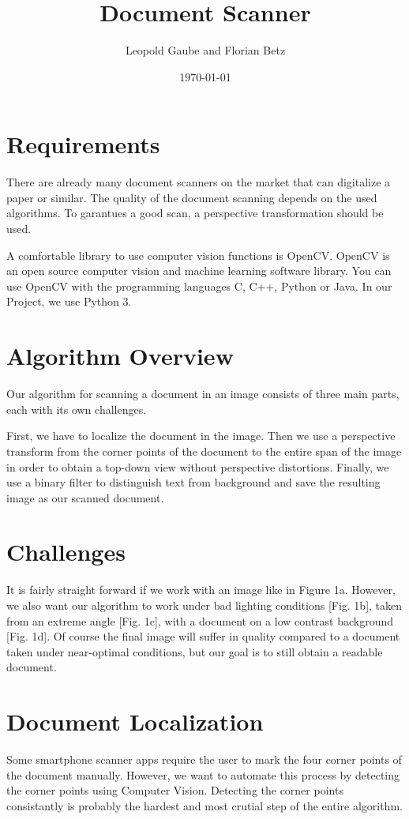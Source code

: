 \documentclass[bibliography=totoc]{scrartcl}
\title{Document Scanner}
\author{Leopold Gaube and Florian Betz}
\date{\today}
\begin{document}
	\maketitle
	\tableofcontents

	\clearpage

	\section{Requirements}
	There are already many document scanners on the market that can digitalize a paper or similar. 
	The quality of the document scanning depends on the used algorithms.
	To garantues a good scan, a perspective transformation should be used.
	
	A comfortable library to use computer vision functions is \ac{OpenCV}.
	\ac{OpenCV} is an open source computer vision and machine learning software library. \cite{OpenCV}
	You can use OpenCV with the programming languages C, C++, Python or Java.
	In our Project, we use Python 3.
	

    \section{Algorithm Overview}
	Our algorithm for scanning a document in an image consists of three main parts, each with its own challenges.
	
	First, we have to localize the document in the image. 
	Then we use a perspective transform from the corner points of the document to the entire span of the image in order to obtain a top-down view without perspective distortions.
	Finally, we use a binary filter to distinguish text from background and save the resulting image as our scanned document.

	\section{Challenges}
	It is fairly straight forward if we work with an image like in Figure 1a.
	However, we also want our algorithm to work under bad lighting conditions [Fig. 1b], taken from an extreme angle [Fig. 1c], with a document on a low contrast background [Fig. 1d].
	Of course the final image will suffer in quality compared to a document taken under near-optimal conditions, but our goal is to still obtain a readable document.
	
	\section{Document Localization}
	Some smartphone scanner apps require the user to mark the four corner points of the document manually. 
	However, we want to automate this process by detecting the corner points using Computer Vision.
	Detecting the corner points consistantly is probably the hardest and most crutial step of the entire algorithm. 
	
\end{document}
